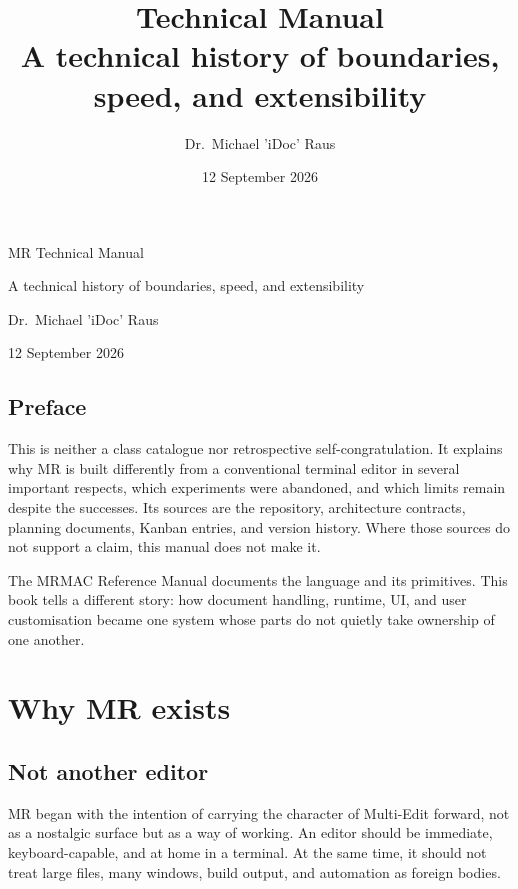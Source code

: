 \documentclass[a4paper,10pt,twoside,openany]{book}
\title{\mr{} Technical Manual\\\large A technical history of boundaries, speed, and extensibility}
\author{Dr.\ Michael 'iDoc' Raus}
\date{12 September 2026}
\newcommand{\mr}{\textsc{MR}}
\begin{document}
\frontmatter
\begin{titlepage}
\begin{center}
\vspace*{\fill}
{\LARGE \mr{} Technical Manual\par}
\vspace{0.5\baselineskip}
{\large A technical history of boundaries, speed, and extensibility\par}
\vspace{3\baselineskip}
{\large Dr.\ Michael 'iDoc' Raus\par}
\vspace{2\baselineskip}
{\large 12 September 2026\par}
\end{center}
\vspace*{\fill}
\end{titlepage}

\chapter*{Preface}

This is neither a class catalogue nor retrospective self-congratulation. It
explains why \mr{} is built differently from a conventional terminal editor in
several important respects, which experiments were abandoned, and which limits
remain despite the successes. Its sources are the repository, architecture
contracts, planning documents, Kanban entries, and version history. Where
those sources do not support a claim, this manual does not make it.

The MRMAC Reference Manual documents the language and its primitives. This
book tells a different story: how document handling, runtime, UI, and user
customisation became one system whose parts do not quietly take ownership of
one another.

\tableofcontents

\mainmatter
\part{Why \mr{} exists}

\chapter{Not another editor}

\mr{} began with the intention of carrying the character of Multi-Edit
forward, not as a nostalgic surface but as a way of working. An editor should
be immediate, keyboard-capable, and at home in a terminal. At the same time,
it should not treat large files, many windows, build output, and automation as
foreign bodies.
\end{document}
